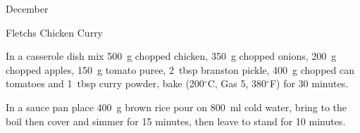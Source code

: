 \begin{menu}{December}
\begin{recipe}{2}{Fletchs Chicken Curry}
\begin{ingredients}
		\end{ingredients}
	
	
    \begin{instructions}
    \item 
        In a casserole dish mix
        500~g chopped chicken,
        350~g chopped onions,
        200~g chopped apples,
        150~g  tomato puree,
        2~tbsp  branston pickle,
        400~g chopped can tomatoes
        and
        1~tbsp  curry powder,
        bake (200$^{\circ}$C, Gas 5, 380$^{\circ}$F) for 30 minutes.
      \item 
      In a
      sauce pan
      place
      400~g  brown rice
      pour on
      800~ml  cold water,
      bring to the boil then cover and simmer for 15 minutes,
      then leave to stand for 10 minutes.
    
    \end{instructions}
    \end{recipe}%
  
    \clearpage
    \end{menu}
	
	